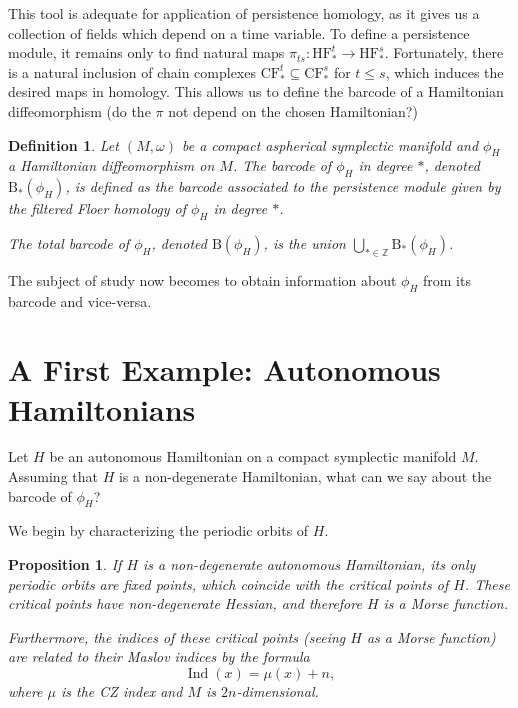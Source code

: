 \documentclass{article}
\newtheorem{prop}{Proposition}
\newtheorem{definition}{Definition}
\theoremstyle{nonumberplain}
\newcommand{\Z}{\mathbb{Z}}
\newcommand{\BB}{\mathrm{B}}
\newcommand{\CF}{\mathrm{CF}}
\newcommand{\HF}{\mathrm{HF}}
\DeclareMathOperator{\Ind}{Ind}
\begin{document}
This tool is adequate for application of persistence homology, as it gives us a collection of fields which depend on a time variable. To define a persistence module, it remains only to find natural maps $\pi_{ts} \colon \HF^t_* \to \HF^s_*$. Fortunately, there is a natural inclusion of chain complexes $\CF^t_* \subseteq \CF^s_*$ for $t \leq s$, which induces the desired maps in homology. This allows us to define the barcode of a Hamiltonian diffeomorphism (do the $\pi$ not depend on the chosen Hamiltonian?)

\begin{definition}
Let $(M,\omega)$ be a compact aspherical symplectic manifold and $\phi_H$ a Hamiltonian diffeomorphism on $M$. The \emph{barcode of $\phi_H$ in degree $*$}, denoted $\BB_*(\phi_H)$, is defined as the barcode associated to the persistence module given by the filtered Floer homology of $\phi_H$ in degree $*$.

The \emph{total barcode of $\phi_H$}, denoted $\BB(\phi_H)$, is the union $\bigcup_{* \in \Z} \BB_*(\phi_H)$.
\end{definition}

The subject of study now becomes to obtain information about $\phi_H$ from its barcode and vice-versa.

\section{A First Example: Autonomous Hamiltonians}\label{subsecautonomous}

Let $H$ be an autonomous Hamiltonian on a compact symplectic manifold $M$. Assuming that $H$ is a non-degenerate Hamiltonian, what can we say about the barcode of $\phi_H$?

We begin by characterizing the periodic orbits of $H$.

\begin{prop}\label{authamfloermorse}
If $H$ is a non-degenerate autonomous Hamiltonian, its only periodic orbits are fixed points, which coincide with the critical points of $H$. These critical points have non-degenerate Hessian, and therefore $H$ is a Morse function.

Furthermore, the indices of these critical points (seeing $H$ as a Morse function) are related to their Maslov indices by the formula
\begin{equation}
\Ind(x) = \mu(x) + n,
\end{equation}
where $\mu$ is the CZ index and $M$ is $2n$-dimensional.
\end{prop}
\end{document}
